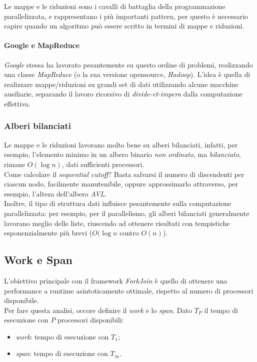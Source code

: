 Le mappe e le riduzioni sono i cavalli di battaglia della programmazione parallelizzata, e rappresentano i più importanti pattern, per questo è necessario capire quando un algoritmo può essere scritto in termini di mappe e riduzioni.

\paragraph{Google e MapReduce}
\textit{Google} stessa ha lavorato pesantemente su questo ordine di problemi, realizzando una classe \textit{MapReduce} (o la sua versione opensource, \textit{Hadoop}). L'idea è quella di realizzare mappe/riduzioni su grandi set di dati utilizzando alcune macchine ausiliarie, separando il lavoro ricorsivo di \textit{divide-et-impera} dalla computazione effettiva.

\subsubsection{Alberi bilanciati}
Le mappe e le riduzioni lavorano molto bene su alberi bilanciati, infatti, per esempio, l'elemento minimo in un albero binario \textit{non ordinato}, ma \textit{bilanciato}, rimane $O(\log{n})$, dati sufficienti processori. \\
Come calcolare il \textit{sequential cutoff}? Basta salvarsi il numero di discendenti per ciascun nodo, facilmente manutenibile, oppure approssimarlo attraverso, per esempio, l'alteza dell'albero \textit{AVL}. \\
Inoltre, il tipo di struttura dati influisce pesantemente sulla computazione parallelizzata: per esempio, per il parallelismo, gli alberi bilanciati generalmente lavorano meglio delle liste, riuscendo ad ottenere risultati con tempistiche esponenzialmente più brevi ($O(\log{n}$ contro $O(n)$).

\subsection{Work e Span}
L'obiettivo principale con il framework \textit{ForkJoin} è  quello di ottenere una performance a runtime asintoticamente ottimale, rispetto al numero di processori disponibile. \\
Per fare questa analisi, occore definire il \textit{work} e lo \textit{span}. Dato $T_{P}$ il tempo di esecuzione con $P$ processori disponibili:
\begin{itemize}
	\item \textit{work}: tempo di esecuzione con $T_{1}$;
	\item \textit{span}: tempo di esecuzione con $T_{\infty}$.
\end{itemize}

